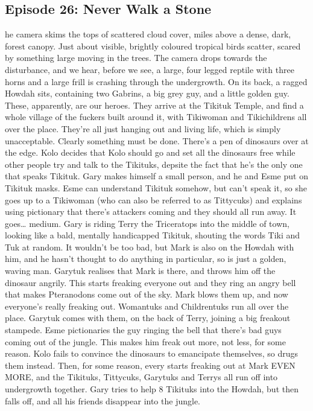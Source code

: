 \subsection{Episode 26: Never Walk a Stone}
he camera skims the tops of scattered cloud cover, miles above a dense, dark, forest canopy. Just about visible, brightly coloured tropical birds scatter, scared by something large moving in the trees.\medskip
The camera drops towards the disturbance, and we hear, before we see, a large, four legged reptile with three horns and a large frill is crashing through the undergrowth. On its back, a ragged Howdah sits, containing two Gabrins, a big grey guy, and a little golden guy.\medskip
These, apparently, are our heroes.\medskip
They arrive at the Tikituk Temple, and find a whole village of the fuckers built around it, with Tikiwoman and Tikichildrens all over the place.\medskip
They’re all just hanging out and living life, which is simply unacceptable. Clearly something must be done.\medskip
There’s a pen of dinosaurs over at the edge.\medskip
Kolo decides that Kolo should go and set all the dinosaurs free while other people try and talk to the Tikituks, depsite the fact that he’s the only one that speaks Tikituk. Gary makes himself a small person, and he and Esme put on Tikituk masks.\medskip
Esme can understand Tikituk somehow, but can’t speak it, so she goes up to a Tikiwoman (who can also be referred to as Tittycuks) and explains using pictionary that there’s attackers coming and they should all run away. It goes… medium.\medskip
Gary is riding Terry the Triceratops into the middle of town, looking like a bald, mentally handicapped Tikituk, shouting the words Tiki and Tuk at random. It wouldn’t be too bad, but Mark is also on the Howdah with him, and he hasn’t thought to do anything in particular, so is just a golden, waving man.\medskip
Garytuk realises that Mark is there, and throws him off the dinosaur angrily.\medskip
This starts freaking everyone out and they ring an angry bell that makes Pteranodons come out of the sky. Mark blows them up, and now everyone’s really freaking out.\medskip
Womantuks and Childrentuks run all over the place. Garytuk comes with them, on the back of Terry, joining a big freakout stampede. Esme pictionaries the guy ringing the bell that there’s bad guys coming out of the jungle. This makes him freak out more, not less, for some reason.\medskip
Kolo fails to convince the dinosaurs to emancipate themselves, so drugs them instead.\medskip
Then, for some reason, every starts freaking out at Mark EVEN MORE, and the Tikituks, Tittycuks, Garytuks and Terrys all run off into undergrowth together. Gary tries to help 8 Tikituks into the Howdah, but then falls off, and all his friends disappear into the jungle.\medskip

